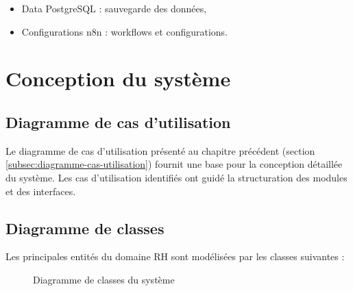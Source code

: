\begin{itemize}
    \item Data PostgreSQL : sauvegarde des données,
    
    \item Configurations n8n : workflows et configurations.
\end{itemize}


\section{Conception du système}
\label{sec:conception-systeme}

\subsection{Diagramme de cas d'utilisation}
\label{subsec:diagramme-uc-chap2}

Le diagramme de cas d'utilisation présenté au chapitre précédent (section \ref{subsec:diagramme-cas-utilisation}) fournit une base pour la conception détaillée du système. Les cas d'utilisation identifiés ont guidé la structuration des modules et des interfaces.


\subsection{Diagramme de classes}
\label{subsec:diagramme-classes}

Les principales entités du domaine RH sont modélisées par les classes suivantes :

\begin{figure}[!ht]
    \centering
    \caption{Diagramme de classes du système}
    \label{fig:classe-diagram}
\end{figure}

